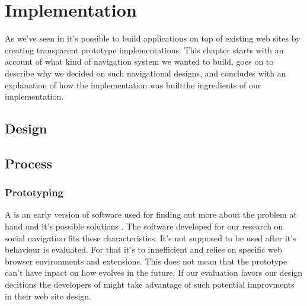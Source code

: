 \chapter{Implementation}
\label{chapter:implementation}


As we've seen in 
it's possible to build applications on top of existing web sites by creating
transparent prototype implementations. This chapter starts with an account of
what kind of navigation system we wanted to build, goes on to describe why we
decided on such navigational designs, and concludes with an explanation of how
the implementation was built\dash{}the ingredients of our implementation.

\section{Design}


\section{Process}

\subsection{Prototyping}

A  is an early version of software used for finding out more
about the problem at hand and it's possible solutions
\citep[p.~409]{somerville07}.
The software developed for our research on social navigation fits these
characteristics. It's not supposed to be used after it's behaviour is
evaluated. For that it's to innefficient and relies on specific web browser
environments and extensions. This does not mean that the prototype can't have
inpact on how \urort evolves in the future. If our evaluation favors our
design decitions the developers of \urort might take advantage of such
potential improvments in their web site design.

